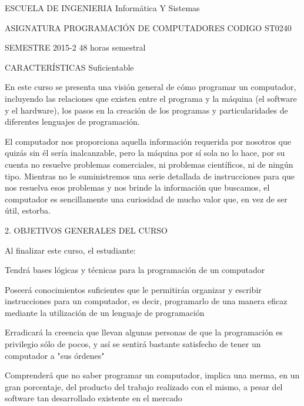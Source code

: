 ESCUELA DE INGENIERIA
Informática Y Sistemas

ASIGNATURA PROGRAMACIÓN DE COMPUTADORES
CODIGO ST0240

SEMESTRE 2015-2
48 horas semestral

CARACTERÍSTICAS Suficientable

En este curso se presenta una visión general de cómo programar un computador, incluyendo las relaciones que existen entre el programa y la máquina (el software y el hardware), los pasos en la creación de los programas y particularidades de diferentes lenguajes de programación.

El computador nos proporciona aquella información requerida por nosotros que quizás sin él sería inalcanzable, pero la máquina por sí sola no lo hace, por su cuenta no resuelve problemas comerciales, ni problemas científicos, ni de ningún tipo. Mientras no le suministremos una serie detallada de instrucciones para que nos resuelva esos problemas y nos brinde la información que buscamos, el computador es sencillamente una curiosidad de mucho valor que, en vez de ser útil, estorba.

2. OBJETIVOS GENERALES DEL CURSO

Al finalizar este curso, el estudiante:

Tendrá bases lógicas y técnicas para la programación de un computador 

Poseerá conocimientos suficientes que le permitirán organizar y escribir instrucciones para un computador, es decir, programarlo de una manera eficaz mediante la utilización de un lenguaje de programación

Erradicará la creencia que llevan algunas personas de que la programación es privilegio sólo de pocos, y así se sentirá bastante satisfecho de tener un computador a "sus órdenes"

Comprenderá que no saber programar un computador, implica una merma, en un gran porcentaje, del producto del trabajo realizado con el mismo, a pesar del software tan desarrollado existente en el mercado

